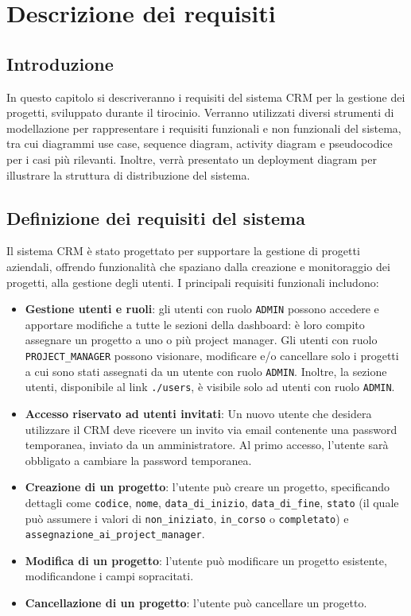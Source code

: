 \documentclass[target=bach,aauheader=,style=]{thud}
\begin{document}
\chapter{Descrizione dei requisiti}

\section{Introduzione}
In questo capitolo si descriveranno i requisiti del sistema CRM per la gestione dei progetti, sviluppato durante il tirocinio. Verranno utilizzati diversi strumenti di modellazione per rappresentare i requisiti funzionali e non funzionali del sistema, tra cui diagrammi use case, sequence diagram, activity diagram e pseudocodice per i casi più rilevanti. Inoltre, verrà presentato un deployment diagram per illustrare la struttura di distribuzione del sistema.

\section{Definizione dei requisiti del sistema}
Il sistema CRM è stato progettato per supportare la gestione di progetti aziendali, offrendo funzionalità che spaziano dalla creazione e monitoraggio dei progetti, alla gestione degli utenti. I principali requisiti funzionali includono:

\begin{itemize}
    \item \textbf{Gestione utenti e ruoli}: gli utenti con ruolo \texttt{ADMIN} possono accedere e apportare modifiche a tutte le sezioni della dashboard: è loro compito assegnare un progetto a uno o più project manager. Gli utenti con ruolo \texttt{PROJECT\_MANAGER} possono visionare, modificare e/o cancellare solo i progetti a cui sono stati assegnati da un utente con ruolo \texttt{ADMIN}. Inoltre, la sezione utenti, disponibile al link \texttt{./users}, è visibile solo ad utenti con ruolo \texttt{ADMIN}.
    \item \textbf{Accesso riservato ad utenti invitati}: Un nuovo utente che desidera utilizzare il CRM deve ricevere un invito via email contenente una password temporanea, inviato da un amministratore. Al primo accesso, l'utente sarà obbligato a cambiare la password temporanea.
    \item \textbf{Creazione di un progetto}: l'utente può creare un progetto, specificando dettagli come \texttt{codice}, \texttt{nome}, \texttt{data\_di\_inizio}, \texttt{data\_di\_fine}, \texttt{stato} (il quale può assumere i valori di \texttt{non\_iniziato}, \texttt{in\_corso} o \texttt{completato}) e \texttt{assegnazione\_ai\_project\_manager}.
    \item \textbf{Modifica di un progetto}: l'utente può modificare un progetto esistente, modificandone i campi sopracitati.
    \item \textbf{Cancellazione di un progetto}: l'utente può cancellare un progetto. 
\end{itemize}
\end{document}
